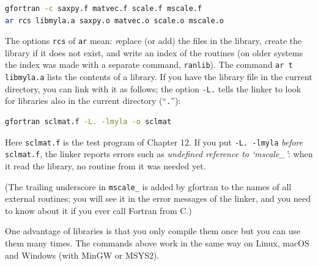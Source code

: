 \begin{lstlisting}[language=bash]
gfortran -c saxpy.f matvec.f scale.f mscale.f
ar rcs libmyla.a saxpy.o matvec.o scale.o mscale.o
\end{lstlisting}

The options \texttt{rcs} of \texttt{ar} mean: \emph{r}eplace (or add) the files in the library, \emph{c}reate the library if it does not exist, and write an index of the routines (on older systems the index was made with a separate command, \texttt{ranlib}). The command \texttt{ar t libmyla.a} lists the contents of a library. If you have the library file in the current directory, you can link with it as follows; the option \texttt{-L.} tells the linker to look for libraries also in the current directory (``\texttt{.}''):

\begin{lstlisting}[language=bash]
gfortran sclmat.f -L. -lmyla -o sclmat
\end{lstlisting}

Here \texttt{sclmat.f} is the test program of Chapter 12. If you put \texttt{-L. -lmyla} \emph{before} \texttt{sclmat.f}, the linker reports errors such as \emph{undefined reference to `mscale\_'}: when it read the library, no routine from it was needed yet.

(The trailing underscore in \texttt{mscale\_} is added by gfortran to the names of all external routines; you will see it in the error messages of the linker, and you need to know about it if you ever call Fortran from C.)

One advantage of libraries is that you only compile them once but you can use them many times. The commands above work in the same way on Linux, macOS and Windows (with MinGW or MSYS2).
